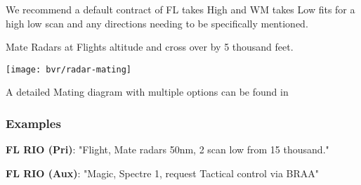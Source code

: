 We recommend a default contract of FL takes High and WM takes Low fits for a
high low scan and any directions needing to be specifically mentioned.

Mate Radars at Flights altitude and cross over by 5 thousand feet.

\texttt{[image: bvr/radar-mating]}

A detailed Mating diagram with multiple options can be found in

\subsubsection*{Examples}

\textbf{FL RIO (Pri)}: "Flight, Mate radars 50nm, 2 scan low from 15
thousand."

\textbf{FL RIO (Aux)}: "Magic, Spectre 1, request Tactical control via BRAA"
